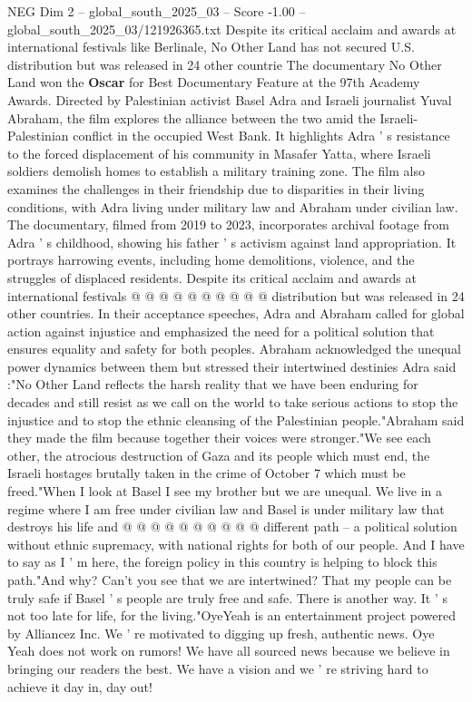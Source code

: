 \begin{textsample}{NEG Dim 2 – global\_south\_2025\_03 – Score -1.00 – global\_south\_2025\_03/121926365.txt}  \label{ex:f2_neg_155}
Despite its critical acclaim and awards at international festivals like Berlinale, No Other Land has not secured U.S. distribution but was released in 24 other countrie The documentary No Other Land won the \textbf{Oscar} for Best Documentary Feature at the 97th Academy Awards.
Directed by Palestinian activist Basel Adra and Israeli journalist Yuval Abraham, the film explores the alliance between the two amid the Israeli-Palestinian conflict in the occupied West Bank.
It highlights Adra ' s resistance to the forced displacement of his community in Masafer Yatta, where Israeli soldiers demolish homes to establish a military training zone.
The film also examines the challenges in their friendship due to disparities in their living conditions, with Adra living under military law and Abraham under civilian law.
The documentary, filmed from 2019 to 2023, incorporates archival footage from Adra ' s childhood, showing his father ' s activism against land appropriation.
It portrays harrowing events, including home demolitions, violence, and the struggles of displaced residents.
Despite its critical acclaim and awards at international festivals @ @ @ @ @ @ @ @ @ @ distribution but was released in 24 other countries.
In their acceptance speeches, Adra and Abraham called for global action against injustice and emphasized the need for a political solution that ensures equality and safety for both peoples.
Abraham acknowledged the unequal power dynamics between them but stressed their intertwined destinies Adra said :"No Other Land reflects the harsh reality that we have been enduring for decades and still resist as we call on the world to take serious actions to stop the injustice and to stop the ethnic cleansing of the Palestinian people."Abraham said they made the film because together their voices were stronger."We see each other, the atrocious destruction of Gaza and its people which must end, the Israeli hostages brutally taken in the crime of October 7 which must be freed."When I look at Basel I see my brother but we are unequal.
We live in a regime where I am free under civilian law and Basel is under military law that destroys his life and @ @ @ @ @ @ @ @ @ @ different path -- a political solution without ethnic supremacy, with national rights for both of our people.
And I have to say as I ' m here, the foreign policy in this country is helping to block this path."And why?
Can't you see that we are intertwined?
That my people can be truly safe if Basel ' s people are truly free and safe.
There is another way.
It ' s not too late for life, for the living."OyeYeah is an entertainment project powered by Alliancez Inc.
We ' re motivated to digging up fresh, authentic news.
Oye Yeah does not work on rumors!
We have all sourced news because we believe in bringing our readers the best.
We have a vision and we ' re striving hard to achieve it day in, day out!

\end{textsample}
